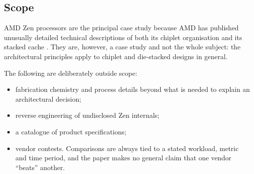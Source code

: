 \subsection{Scope}
\label{sec:scope}

AMD Zen processors are the principal case study because AMD has published unusually detailed technical descriptions of both its chiplet organisation and its stacked cache \cite{naffziger2020chiplet,suggs2019zen2,amd2022epyc7003,swaminathanAdvancedPackagingEnabling2021}. They are, however, a case study and not the whole subject: the architectural principles apply to chiplet and die-stacked designs in general.

The following are deliberately outside scope:

\begin{itemize}
  \item fabrication chemistry and process details beyond what is needed to explain an architectural decision;
  \item reverse engineering of undisclosed Zen internals;
  \item a catalogue of product specifications;
  \item vendor contests. Comparisons are always tied to a stated workload, metric and time period, and the paper makes no general claim that one vendor ``beats'' another.
\end{itemize}

